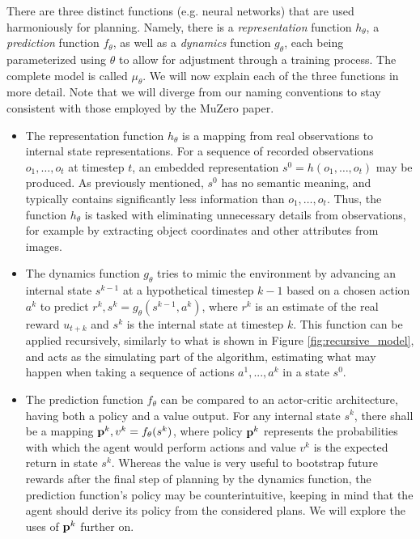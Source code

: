 There are three distinct functions (e.g. neural networks) that are used harmoniously for planning. Namely, there is a \textit{representation} function $h_\theta$, a \textit{prediction} function $f_\theta$, as well as a \textit{dynamics} function $g_\theta$, each being parameterized using $\theta$ to allow for adjustment through a training process. The complete model is called $\mu_\theta$. We will now explain each of the three functions in more detail. Note that we will diverge from our naming conventions to stay consistent with those employed by the MuZero paper.
\begin{itemize}
    \item The representation function $h_\theta$ is a mapping from real observations to internal state representations. For a sequence of recorded observations $o_1, \dots, o_t$ at timestep $t$, an embedded representation $s^0 = h(o_1, \dots, o_t)$ may be produced. As previously mentioned, $s^0$ has no semantic meaning, and typically contains significantly less information than $o_1, \dots, o_t$. Thus, the function $h_\theta$ is tasked with eliminating unnecessary details from observations, for example by extracting object coordinates and other attributes from images.

    \item The dynamics function $g_\theta$ tries to mimic the environment by advancing an internal state $s^{k-1}$ at a hypothetical timestep $k-1$ based on a chosen action $a^k$ to predict $r^k, s^k = g_\theta\left(s^{k-1}, a^k\right)$, where $r^k$ is an estimate of the real reward $u_{t+k}$ and $s^k$ is the internal state at timestep $k$. This function can be applied recursively, similarly to what is shown in Figure \ref{fig:recursive_model}, and acts as the simulating part of the algorithm, estimating what may happen when taking a sequence of actions $a^1, ..., a^k$ in a state $s^0$.

    \item The prediction function $f_\theta$ can be compared to an actor-critic architecture, having both a policy and a value output. For any internal state $s^k$, there shall be a mapping $\text{\textbf{p}}^k, v^k = f_\theta(s^k)$, where policy $\text{\textbf{p}}^k$ represents the probabilities with which the agent would perform actions and value $v^k$ is the expected return in state $s^k$. Whereas the value is very useful to bootstrap future rewards after the final step of planning by the dynamics function, the prediction function's policy may be counterintuitive, keeping in mind that the agent should derive its policy from the considered plans. We will explore the uses of $\text{\textbf{p}}^k$ further on.
\end{itemize}

